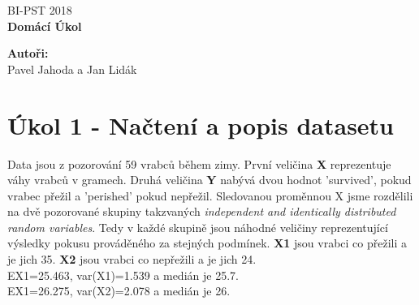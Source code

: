 \documentclass[12pt,a4paper]{article}
\begin{document}
\begin{titlepage}
  \thispagestyle{fancy}

  \vspace*{\fill}
  \begin{center}
    {\fontsize{20}{30}\selectfont BI-PST 2018}\\[1cm]
    {\fontsize{30}{100}\selectfont \textbf{Domácí Úkol}}\\[4.2cm]
  \end{center}

  \vspace*{\fill}

  {\fontsize{10}{10} \selectfont \noindent
  \textbf{Autoři:}\\
  Pavel Jahoda a Jan Lidák
  }
\end{titlepage}

\renewcommand{\headrulewidth}{0.4pt}
\renewcommand{\footrulewidth}{0.4pt}


\tableofcontents

\newpage


\section{Úkol 1 - Načtení a popis datasetu}
Data jsou z pozorování 59 vrabců během zimy. První veličina {\bf X} reprezentuje váhy vrabců v gramech. Druhá veličina {\bf Y} nabývá dvou hodnot 'survived', pokud vrabec přežil a 'perished' pokud nepřežil. Sledovanou proměnnou X jsme rozdělili na dvě pozorované skupiny takzvaných \textit{independent and identically distributed random variables}. Tedy v každé skupině jsou náhodné veličiny reprezentující výsledky pokusu prováděného za stejných podmínek.  {\bf X1} jsou vrabci co přežili a je jich 35. {\bf X2} jsou vrabci co nepřežili a je jich 24.\\
EX1=25.463, var(X1)=1.539 a medián je 25.7.\\
EX1=26.275, var(X2)=2.078 a medián je 26.\\
\par \bigskip
\end{document}
